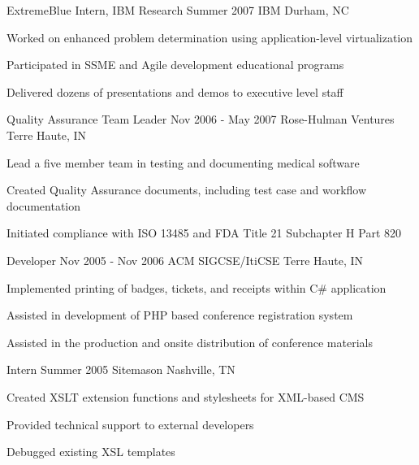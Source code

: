 {\begin{cventries}
  \cventry
  {ExtremeBlue Intern, IBM Research}
  {Summer 2007}
  {IBM}
  {Durham, NC}
  {
    \begin{cvitems}
      \item Worked on enhanced problem determination using application-level virtualization
      \item Participated in SSME and Agile development educational programs
      \item Delivered dozens of presentations and demos to executive level staff
    \end{cvitems}
    \cvtags{
      \tagCplusplus
      \tagPublicSpeaking
    }
  }

  \cventry
  {Quality Assurance Team Leader}
  {Nov 2006 - May 2007}
  {Rose-Hulman Ventures}
  {Terre Haute, IN}
  {
    \begin{cvitems}
      \item Lead a five member team in testing and documenting medical software
      \item Created Quality Assurance documents, including test case and workflow documentation
      \item Initiated compliance with ISO 13485 and FDA Title 21 Subchapter H Part 820
    \end{cvitems}
    \cvtags{\tagManualQATestingShort}
  }

  \cventry
  {Developer}
  {Nov 2005 - Nov 2006}
  {ACM SIGCSE/ItiCSE}
  {Terre Haute, IN}
  {
    \begin{cvitems}
      \item Implemented printing of badges, tickets, and receipts within C\# application
      \item Assisted in development of PHP based conference registration system
      \item Assisted in the production and onsite distribution of conference materials
    \end{cvitems}
    \cvtags{
      \tagCSharp
      \tagPHP
      \tagMSSQL
      \tagCustomerService
    }
  }

  \cventry
  {Intern}
  {Summer 2005}
  {Sitemason}
  {Nashville, TN}
  {
    \begin{cvitems}
      \item Created XSLT extension functions and stylesheets for XML-based CMS
      \item Provided technical support to external developers
      \item Debugged existing XSL templates
    \end{cvitems}
    \cvtags{
      \tagCSS
      \tagHTML
      \tagJavaScript
      \tagXML
      \tagXSLT
    }
  }


\end{cventries}}

